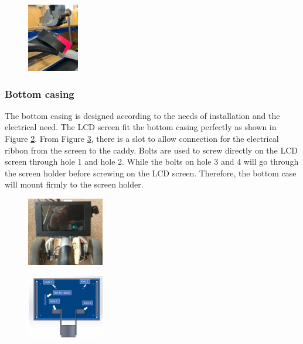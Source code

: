 \documentclass[11pt,landscape]{article}
\begin{document}
\begin{multicols}{3}
    \begin{figure}[H]
        \begin{center}
            \includegraphics[width=0.2\textwidth]{Figure18.jpg}
            \label{fig:fold}
        \end{center}
    \end{figure}
    
    
    \subsubsection{Bottom casing}
    The bottom casing is designed according to the needs of installation and the
    electrical need. The LCD screen fit the bottom casing perfectly as shown in
    Figure \ref{fig:LCD}. From Figure \ref{fig:bottom}, there is a slot to allow
    connection for the electrical ribbon from the screen to the caddy. Bolts are
    used to screw directly on the LCD screen through hole 1 and hole 2. While
    the bolts on hole 3 and 4 will go through the screen holder before screwing
    on the LCD screen. Therefore, the bottom case will mount firmly to the
    screen holder.
    
    \begin{figure}[H]
        \begin{center}
            \includegraphics[width=0.3\textwidth]{Figure32.jpg}
            \label{fig:LCD}
        \end{center}
    \end{figure}
    
    
    \begin{figure}[H]
        \begin{center}
            \includegraphics[width=0.3\textwidth]{Figure11.jpg}
            \label{fig:bottom}
        \end{center}
    \end{figure}
    


\end{multicols}
\end{document}
